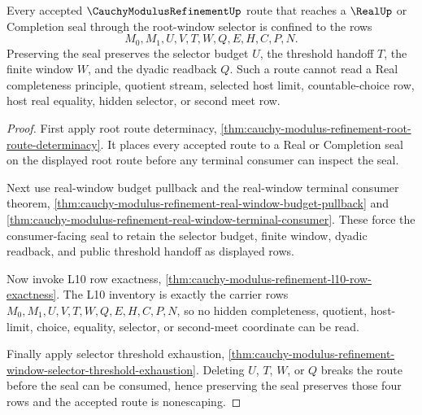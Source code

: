 \begin{theorem}
\label{thm:cauchy-modulus-refinement-real-seal-route-nonescape}
Every accepted $\CauchyModulusRefinementUp$ route that reaches a $\RealUp$ or Completion seal through the root-window selector is confined to the rows
$$
M_0,M_1,U,V,T,W,Q,E,H,C,P,N.
$$
Preserving the seal preserves the selector budget $U$, the threshold handoff $T$, the finite window $W$, and the dyadic readback $Q$. Such a route cannot read a Real completeness principle, quotient stream, selected host limit, countable-choice row, host real equality, hidden selector, or second meet row.
\end{theorem}
\begin{proof}
First apply root route determinacy, \autoref{thm:cauchy-modulus-refinement-root-route-determinacy}. It places every accepted route to a Real or Completion seal on the displayed root route before any terminal consumer can inspect the seal.

Next use real-window budget pullback and the real-window terminal consumer theorem, \autoref{thm:cauchy-modulus-refinement-real-window-budget-pullback} and \autoref{thm:cauchy-modulus-refinement-real-window-terminal-consumer}. These force the consumer-facing seal to retain the selector budget, finite window, dyadic readback, and public threshold handoff as displayed rows.

Now invoke L10 row exactness, \autoref{thm:cauchy-modulus-refinement-l10-row-exactness}. The L10 inventory is exactly the carrier rows $M_0,M_1,U,V,T,W,Q,E,H,C,P,N$, so no hidden completeness, quotient, host-limit, choice, equality, selector, or second-meet coordinate can be read.

Finally apply selector threshold exhaustion, \autoref{thm:cauchy-modulus-refinement-window-selector-threshold-exhaustion}. Deleting $U$, $T$, $W$, or $Q$ breaks the route before the seal can be consumed, hence preserving the seal preserves those four rows and the accepted route is nonescaping.
\end{proof}

